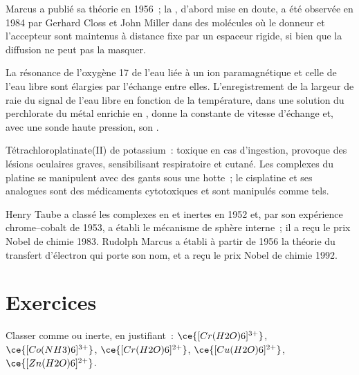 Marcus a publié sa théorie en 1956~; la , d'abord mise en
doute, a été observée en 1984 par Gerhard Closs et John Miller dans des
molécules où le donneur et l'accepteur sont maintenus à distance fixe par
un espaceur rigide, si bien que la diffusion ne peut pas la masquer.

\begin{inthelab}
La résonance de l'oxygène 17 de l'eau liée à un ion paramagnétique et celle
de l'eau libre sont élargies par l'échange entre elles. L'enregistrement de
la largeur de raie du signal de l'eau libre en fonction de la température,
dans une solution du perchlorate du métal enrichie en , donne la
constante de vitesse d'échange et, avec une sonde haute pression, son
.
\end{inthelab}

\begin{safety}{}
Tétrachloroplatinate(II) de potassium~: toxique en cas d'ingestion,
provoque des lésions oculaires graves, sensibilisant respiratoire et
cutané. Les complexes du platine se manipulent avec des gants sous une
hotte~; le cisplatine et ses analogues sont des médicaments cytotoxiques et
sont manipulés comme tels.
\end{safety}

\begin{history}
Henry Taube a classé les complexes en  et inertes en 1952 et, par
son expérience chrome--cobalt de 1953, a établi le mécanisme de sphère
interne~; il a reçu le prix Nobel de chimie 1983. Rudolph Marcus a établi à
partir de 1956 la théorie du transfert d'électron qui porte son nom, et a
reçu le prix Nobel de chimie 1992.
\end{history}

\section{Exercices}

\begin{exercise}[$\star$]\label{exo:b3:complex-mechanisms:1}
Classer comme  ou inerte, en justifiant~: $\ce{[Cr(H2O)6]^{3+}}$, $\ce{[Co(NH3)6]^{3+}}$, $\ce{[Cr(H2O)6]^{2+}}$,
$\ce{[Cu(H2O)6]^{2+}}$, $\ce{[Zn(H2O)6]^{2+}}$.
\end{exercise}

